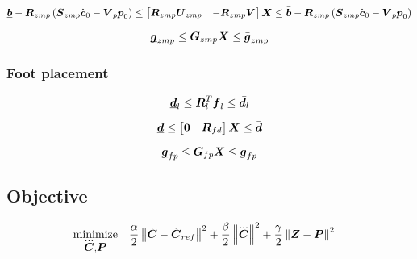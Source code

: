 \begin{equation*}
    \underbar{\mbox{\boldmath $b$}} 
    -
    \mbox{\boldmath $R$}_{zmp}
    \left(
        \mbox{\boldmath $S$}_{zmp} \hat{\mbox{\boldmath $c$}}_0 - \mbox{\boldmath $V$}_p \mbox{\boldmath $p$}_0
    \right)
    \le 
    \begin{bmatrix}
        \mbox{\boldmath $R$}_{zmp} \mbox{\boldmath $U$}_{zmp} & - \mbox{\boldmath $R$}_{zmp} \mbox{\boldmath $V$} \\
    \end{bmatrix}
    \mbox{\boldmath $X$}
    \le
    \bar{\mbox{\boldmath $b$}}
    -
    \mbox{\boldmath $R$}_{zmp}
    \left(
        \mbox{\boldmath $S$}_{zmp} \hat{\mbox{\boldmath $c$}}_0 - \mbox{\boldmath $V$}_p \mbox{\boldmath $p$}_0
    \right)
\end{equation*}

\begin{equation*}
    \underbar{\mbox{\boldmath $g$}}_{zmp}  \le  \mbox{\boldmath $G$}_{zmp} \mbox{\boldmath $X$}  \le  \bar{\mbox{\boldmath $g$}}_{zmp}
\end{equation*}

\subsubsection{Foot placement}
\begin{equation*}
\underbar{\mbox{\boldmath $d$}}_l \le \mbox{\boldmath $R$}_l^T \mbox{\boldmath $f$}_l \le \bar{\mbox{\boldmath $d$}_l}
\end{equation*}

\begin{equation*}
\underbar{\mbox{\boldmath $d$}} \le \begin{bmatrix} \mbox{\boldmath $0$} & \mbox{\boldmath $R$}_{fd} \end{bmatrix} \mbox{\boldmath $X$} \le \bar{\mbox{\boldmath $d$}}
\end{equation*}

\begin{equation*}
\underbar{\mbox{\boldmath $g$}}_{fp}  \le  \mbox{\boldmath $G$}_{fp} \mbox{\boldmath $X$}  \le  \bar{\mbox{\boldmath $g$}}_{fp}
\end{equation*}



\subsection{Objective}
\begin{equation*}
\begin{split}
    \minimize{\cJerk, \FP}  & \frac{\alpha}{2} \norm{\cVel - \cVel_{ref}}^2 + 
                              \frac{\beta}{2}  \norm{\cJerk}^2 + 
                              \frac{\gamma}{2} \norm{\ZMP - \FP}^2
\end{split}
\end{equation*}

